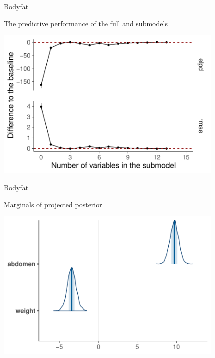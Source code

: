 \documentclass[english,t]{beamer}
\begin{document}
\begin{frame}{Bodyfat}

  \vspace{-0.55\baselineskip}
  The predictive performance of the full and submodels
  
  \includegraphics[width=11cm]{bodyfat_varsel_plot.pdf}

\end{frame}


\begin{frame}{Bodyfat}

  \vspace{-0.55\baselineskip}
  Marginals of projected posterior
  
  \includegraphics[width=11cm]{bodyfat_proj_mcmc_areas.pdf}

\end{frame}
\end{document}
